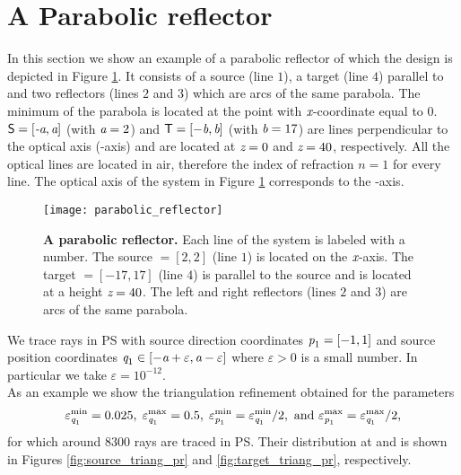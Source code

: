\section{A Parabolic reflector}
In this section we show an example of a parabolic reflector of which the design is depicted in Figure \ref{fig:PR}.
 It consists of a source  (line $1$), a target  (line $4$) parallel to  and two reflectors (lines $2$ and $3$) which are arcs of the same parabola. 
  The minimum of the parabola is located at the point with $\textit{x}$-coordinate equal to $0$. $\textsf{S}=[\textit{-a}, \textit{a}]$ (with $\textit{a}=2$) and $\textsf{T}=[-\textit{b},\textit{b}]$ (with $\textit{b}=17$) are lines perpendicular to the optical axis (-axis) and are located at $\textit{z}=0$ and $\textit{z}=40$, respectively.
All the optical lines are located in air, therefore the index of refraction ${n}=1$ for every line.
The optical axis of the system in Figure \ref{fig:PR} corresponds to the -axis.
\begin{figure}[h!]
\centering
\texttt{[image: parabolic\_reflector]}
\caption{\textbf{A parabolic reflector.}  Each line of the system is labeled with a number.
   The source $= [2,2]$ (line $1$) is located on the $\textit{x}$-axis.
   The target $= [-17, 17]$ (line $4$) is parallel to the source and is located at a height $ \textit{z}= 40$.
   The left and right reflectors (lines $2$ and $3$) are arcs of the same parabola.}
\label{fig:PR}
\end{figure}
We trace rays in PS with source direction coordinates $\textit{p}_1 = [-1,1]$ and source position coordinates $\textit{q}_1\in[-\textit{a}+\varepsilon,\textit{a}-\varepsilon]$ where $\varepsilon>0$ is a small number. In particular we take $\varepsilon = 10^{-12}$.\\ \indent As an example we show the triangulation refinement obtained for the parameters $$\varepsilon_{\textit{q}_1}^{\textrm{min}} = 0.025, \; \varepsilon_{\textit{q}_1}^{\textrm{max}} = 0.5, \; \varepsilon_{\textit{p}_1}^{\textrm{min}} = \varepsilon_{\textit{q}_1}^{\textrm{min}}/2, \mbox{ and }  \varepsilon_{\textit{p}_1}^{\textrm{max}} = \varepsilon_{\textit{q}_1}^{\textrm{max}}/2, $$ for which around $8300$ rays are traced in PS. Their distribution at  and  is shown in Figures \ref{fig:source_triang_pr} and \ref{fig:target_triang_pr}, respectively. 
